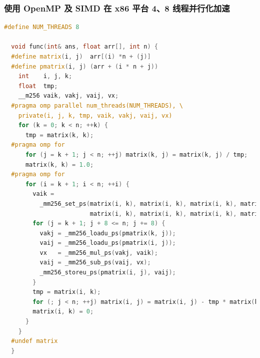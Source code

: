 \documentclass[a4paper]{article}
\begin{document}
\subsubsection{使用 OpenMP 及 SIMD 在 x86 平台 4、8 线程并行化加速}

\begin{lstlisting}[title=x86 OpenMP + AVX 并行化加速,frame=trbl,language={C++}]
  #define NUM_THREADS 8

  void func(int& ans, float arr[], int n) {
  #define matrix(i, j)  arr[(i) *n + (j)]
  #define pmatrix(i, j) (arr + (i * n + j))
    int    i, j, k;
    float  tmp;
    __m256 vaik, vakj, vaij, vx;
  #pragma omp parallel num_threads(NUM_THREADS), \
    private(i, j, k, tmp, vaik, vakj, vaij, vx)
    for (k = 0; k < n; ++k) {
      tmp = matrix(k, k);
  #pragma omp for
      for (j = k + 1; j < n; ++j) matrix(k, j) = matrix(k, j) / tmp;
      matrix(k, k) = 1.0;
  #pragma omp for
      for (i = k + 1; i < n; ++i) {
        vaik =
          _mm256_set_ps(matrix(i, k), matrix(i, k), matrix(i, k), matrix(i, k),
                        matrix(i, k), matrix(i, k), matrix(i, k), matrix(i, k));
        for (j = k + 1; j + 8 <= n; j += 8) {
          vakj = _mm256_loadu_ps(pmatrix(k, j));
          vaij = _mm256_loadu_ps(pmatrix(i, j));
          vx   = _mm256_mul_ps(vakj, vaik);
          vaij = _mm256_sub_ps(vaij, vx);
          _mm256_storeu_ps(pmatrix(i, j), vaij);
        }
        tmp = matrix(i, k);
        for (; j < n; ++j) matrix(i, j) = matrix(i, j) - tmp * matrix(k, j);
        matrix(i, k) = 0;
      }
    }
  #undef matrix
  }
\end{lstlisting}
\end{document}
